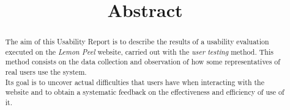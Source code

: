 \documentclass[../UsabilityReport.tex]{subfiles}
\begin{document}
\title{Abstract}
\begin{abstract}
	The aim of this Usability Report is to describe the results of a usability evaluation executed on the \textit{Lemon Peel} website, carried out with the \textit{user testing} method. This method consists on the data collection and observation of how some representatives of real users use the system. \\
	Its goal is to uncover actual difficulties that users have when interacting with the website and to obtain a systematic feedback on the effectiveness and efficiency of use of it.
\end{abstract}

\thispagestyle{fancy}
	\newpage
		
\end{document}
